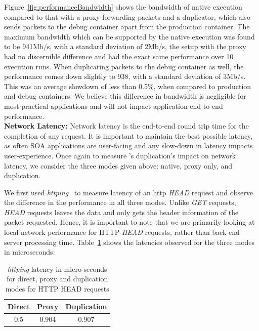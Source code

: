  Figure~\ref{fig:performanceBandwidth} shows the bandwidth of native execution compared to that with a proxy forwarding packets and a duplicator, which also sends packets to the debug container apart from the production container. 
The maximum bandwidth which can be supported by the native execution was found to be 941Mb/s, with a standard deviation of 2Mb/s, the setup with the proxy had no discernible difference and had the exact same performance over 10 execution runs. 
When duplicating packets to the debug container as well, the performance comes down slightly to 938, with a standard deviation of 3Mb/s. 
This was an average slowdown of less than 0.5\%, when compared to production and debug containers. 
We believe this difference in bandwidth is negligible for most practical applications and will not impact application end-to-end performance. \\

\noindent \textbf{Network Latency:}
Network latency is the end-to-end round trip time for the completion of any request. 
It is important to maintain the best possible latency, as often SOA applications are user-facing and any slow-down in latency impacts user-experience. 
Once again to measure \parikshan's duplication's impact on network latency, we consider the three modes given above: native, proxy only, and duplication.

We first used \emph{httping}~\cite{httping} to measure latency of an http \emph{HEAD} request and observe the difference in the performance in all three modes. 
Unlike \emph{GET} requests, \emph{HEAD} requests leaves the data and only gets the header information of the packet requested. 
Hence, it is important to note that we are primarily looking at local network performance for HTTP \emph{HEAD} requests, rather than back-end server processing time.
Table~\ref{tab:httping} shows the latencies observed for the three modes in microseconds:\\


\begin{table}[ht]
	\centering
	\setlength{\tabcolsep}{4pt}
	\begin{center}
		\begin{tabular}{c c c}
			\toprule
			\textbf{Direct} & \textbf{Proxy} & \textbf{Duplication} \\
  			\midrule
  			0.5& 0.904& 0.907 \\
  			\bottomrule
		\end{tabular}
	\end{center}
\caption{ \emph{httping} latency in micro-seconds for direct, proxy and duplication modes for HTTP HEAD requests}
\label{tab:httping}
\end{table}
  

